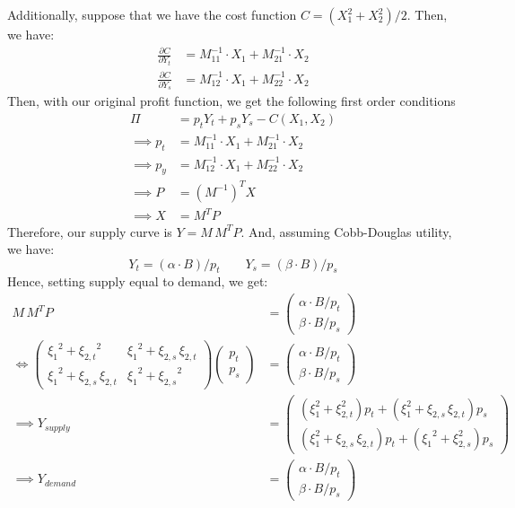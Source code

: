 \documentclass[12pt,a4paper]{extarticle}
\begin{document}
Additionally, suppose that we have the cost function $C = (X_1^2  + X_2^2) / 2$. Then, we have:
\begin{align*}
\frac{\partial C}{\partial Y_t} &= M^{-1}_{11} \cdot X_1 +  M^{-1}_{21} \cdot X_2 \\
\frac{\partial C}{\partial Y_s} &= M^{-1}_{12} \cdot X_1 +  M^{-1}_{22} \cdot X_2 
\end{align*}
Then, with our original profit function, we get the following first order conditions
\begin{align*}
\Pi &= p_t Y_t + p_s Y_s - C(X_1, X_2) \\
\implies p_t &= M^{-1}_{11} \cdot X_1 +  M^{-1}_{21} \cdot X_2 \\
\implies p_y &= M^{-1}_{12} \cdot X_1 +  M^{-1}_{22} \cdot X_2 \\
\implies P &= (M^{-1})^{T} X \\
\implies X &= M^{T} P
\end{align*}
Therefore, our supply curve is $Y = M \, M^{T} P$. 
And, assuming Cobb-Douglas utility, we have:
$$Y_t = (\alpha \cdot B)/p_t \qquad Y_s = (\beta \cdot B)/p_s $$
Hence, setting supply equal to demand, we get:
\begin{align*}
M \, M^{T} P &= 
\begin{pmatrix}
\alpha \cdot B / p_t \\
\beta \cdot B / p_s
\end{pmatrix} \\
\iff 
\left(\begin{array}{cc} {\xi _{1}}^2+{\xi _{2,t}}^2 & {\xi _{1}}^2+\xi _{2,s}\,\xi _{2,t}\\ {\xi _{1}}^2+\xi _{2,s}\,\xi _{2,t} & {\xi _{1}}^2+{\xi _{2,s}}^2 \end{array}\right) 
\begin{pmatrix}
p_t \\
p_s
\end{pmatrix}  
&= \begin{pmatrix}
\alpha \cdot B / p_t \\
\beta \cdot B / p_s
\end{pmatrix} \\
\implies
Y_{supply} &= 
\begin{pmatrix}
(\xi _{1}^2+\xi _{2,t}^2)p_t +  (\xi _{1}^2+\xi _{2,s}\,\xi _{2,t})p_s \\[2ex]
(\xi _{1}^2+\xi _{2,s}\,\xi _{2,t}) p_t  + ({\xi _{1}}^2+\xi _{2,s}^2 ) p_s
\end{pmatrix}\\
\implies
Y_{demand} &= 
\begin{pmatrix}
\alpha \cdot B / p_t \\
\beta \cdot B / p_s
\end{pmatrix} 
\end{align*}
\end{document}
